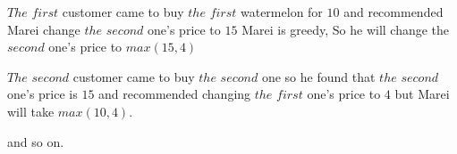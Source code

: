 $The$ $first$ customer came to buy $ the$  $first$ watermelon for $10$ and recommended Marei change $the$  $second$ one's price to $15$ Marei is greedy, So he will change the $second$ one's price to $max(15,4)$


$The$ $second$ customer came to buy $the$  $second$ one so he found that $the$ 
 $second$ one's price is $15$ and recommended changing $the$ $first$ one's price to $4$ but Marei will take $max(10,4)$.

and so on.